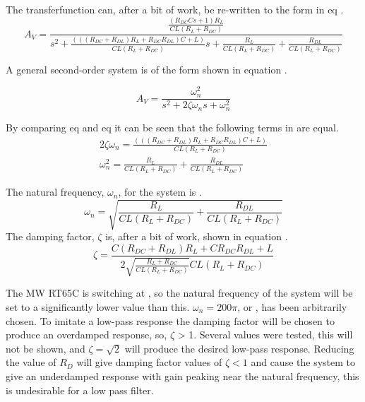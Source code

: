 The transferfunction  can, after a bit of work, be re-written to the form in eq .
\begin{equation}\label{eq:7_1_5_FILTF2}
    A_V = \frac{   \frac{(R_{DC}Cs + 1)R_L}{CL(R_L+R_{DC})}}{s^2 + \frac{(((R_{DC}+R_{DL})R_L + R_{DC}R_{DL})C+L)}{CL(R_L + R_{DC})}s + \frac{R_L}{CL(R_L + R_{DC})} + \frac{R_{DL}}{CL(R_L + R_{DC})}} 
\end{equation}

A general second-order system is of the form shown in equation .

\begin{equation}\label{eq:7_1_5_GENTF}
    A_V = \frac{\omega_n^2}{s^2 + 2\zeta\omega_ns+\omega_n^2}
\end{equation}

By comparing eq  and eq  it can be seen that the following terms in are equal.
\begin{equation}\label{eq:7_1_5_TFFACTORS} 
    \begin{aligned}
        2\zeta\omega_n = \frac{(((R_{DC}+R_{DL})R_L + R_{DC}R_{DL})C+L)}{CL(R_L + R_{DC})} \\
        \omega_n^2 = \frac{R_L}{CL(R_L + R_{DC})} + \frac{R_{DL}}{CL(R_L + R_{DC})}
    \end{aligned}
\end{equation}

The natural frequency, $\omega_n$, for the system is .
\begin{equation}\label{eq:7_1_5_NATFRQ}
    \omega_n = \sqrt{\frac{R_L}{CL(R_L + R_{DC})} + \frac{R_{DL}}{CL(R_L+R_{DC})}}
\end{equation}
The damping factor, $\zeta$ is, after a bit of work, shown in equation .
\begin{equation}\label{eq:7_1_5_DAMPF}
    \zeta = \frac{C(R_{DC}+R_{DL})R_L + CR_{DC}R_{DL} + L}{2\sqrt{\frac{R_L +R_{DC}}{CL(R_L + R_{DC})}}CL(R_L+R_{DC})}
\end{equation}

The MW RT65C is switching at , so the natural frequency of the system will be set to a significantly lower value than this. $\omega_n = 200\pi$, or , has been arbitrarily chosen. To imitate a low-pass response the damping factor will be chosen to produce an overdamped response, so, $\zeta$ > 1. Several values were tested, this will not be shown, and $\zeta = \sqrt{2}$ will produce the desired low-pass response. Reducing the value of $R_D$ will give damping factor values of $\zeta < 1$ and cause the system to give an underdamped response with gain peaking near the natural frequency, this is undesirable for a low pass filter.

